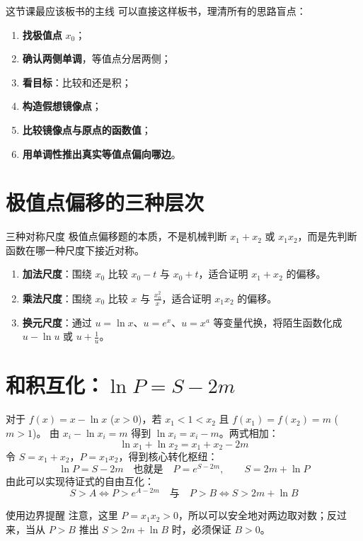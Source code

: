 \documentclass[11pt,a4paper]{ctexart}
\begin{document}
\begin{teachbox}{这节课最应该板书的主线}
可以直接这样板书，理清所有的思路盲点：
\begin{enumerate}
    \item \textbf{找极值点} $x_0$；
    \item \textbf{确认两侧单调}，等值点分居两侧；
    \item \textbf{看目标}：比较和还是积；
    \item \textbf{构造假想镜像点}；
    \item \textbf{比较镜像点与原点的函数值}；
    \item \textbf{用单调性推出真实等值点偏向哪边}。
\end{enumerate}
\end{teachbox}

\section{极值点偏移的三种层次}

\begin{teachbox}{三种对称尺度}
极值点偏移题的本质，不是机械判断 $x_1+x_2$ 或 $x_1x_2$，而是先判断函数在哪一种尺度下接近对称。

\begin{enumerate}
    \item \textbf{加法尺度}：围绕 $x_0$ 比较 $x_0-t$ 与 $x_0+t$，适合证明 $x_1+x_2$ 的偏移。
    \item \textbf{乘法尺度}：围绕 $x_0$ 比较 $x$ 与 $\frac{x_0^2}{x}$，适合证明 $x_1x_2$ 的偏移。
    \item \textbf{换元尺度}：通过 $u=\ln x$、$u=e^x$、$u=x^a$ 等变量代换，将陌生函数化成 $u-\ln u$ 或 $u+\frac1u$。
\end{enumerate}
\end{teachbox}

\section{和积互化：$\ln P = S - 2m$}
对于 $f(x)=x-\ln x$ ($x>0$)，若 $x_1<1<x_2$ 且 $f(x_1)=f(x_2)=m$ ($m>1$)。
由 $x_i-\ln x_i=m$ 得到 $\ln x_i=x_i-m$。两式相加：
\[
\ln x_1+\ln x_2 = x_1+x_2-2m
\]
令 $S=x_1+x_2$，$P=x_1x_2$，得到核心转化枢纽：
\[
\boxed{\ln P=S-2m} \quad \text{也就是} \quad \boxed{P=e^{S-2m}},\qquad \boxed{S=2m+\ln P}
\]
由此可以实现待证式的自由互化：
\[
\boxed{S>A \Longleftrightarrow P>e^{A-2m}} \quad \text{与} \quad \boxed{P>B \Longleftrightarrow S>2m+\ln B}
\]

\begin{keybox}{使用边界提醒}
注意，这里 $P=x_1x_2>0$，所以可以安全地对两边取对数；反过来，当从 $P>B$ 推出 $S>2m+\ln B$ 时，必须保证 $B>0$。
\end{keybox}
\end{document}

